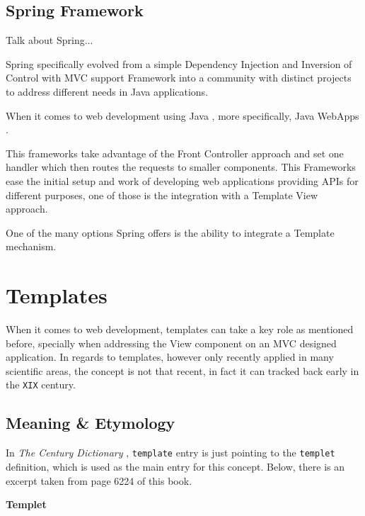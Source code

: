 \begin{itemize}
\subsection{Spring Framework}

\begin{expand}
    Talk about Spring...\cite{Johnson2005ProfessionalFramework}
    
    Spring specifically evolved from a simple Dependency Injection and Inversion of Control with MVC support Framework into a community with distinct projects to address different needs in Java applications.
\end{expand}

When it comes to web development using Java \cite{Bloch2008EffectiveSeries}, more specifically, Java WebApps \cite{Williams2014ProfessionalApplications}.

This frameworks take advantage of the Front Controller approach and set one handler which then routes the requests to smaller components. This Frameworks ease the initial setup and work of developing web applications providing APIs for different purposes, one of those is the integration with a Template View approach.

One of the many options Spring offers is the ability to integrate a Template mechanism.

\section{Templates}

When it comes to web development, templates can take a key role as mentioned before, specially when addressing the View component on an MVC designed application. In regards to templates, however only recently applied in many scientific areas, the concept is not that recent, in fact it can tracked back early in the \texttt{XIX} century.

\subsection{Meaning \& Etymology}

In \textit{The Century Dictionary} \cite[p.6224]{Whitney1906TheDictionary}, \texttt{template} entry is just pointing to the \texttt{templet} definition, which is used as the main entry for this concept. Below, there is an excerpt taken from page 6224 of this book.

\begin{bookQuote}
     \textbf{Templet} 
     

\end{bookQuote}
\end{itemize}
